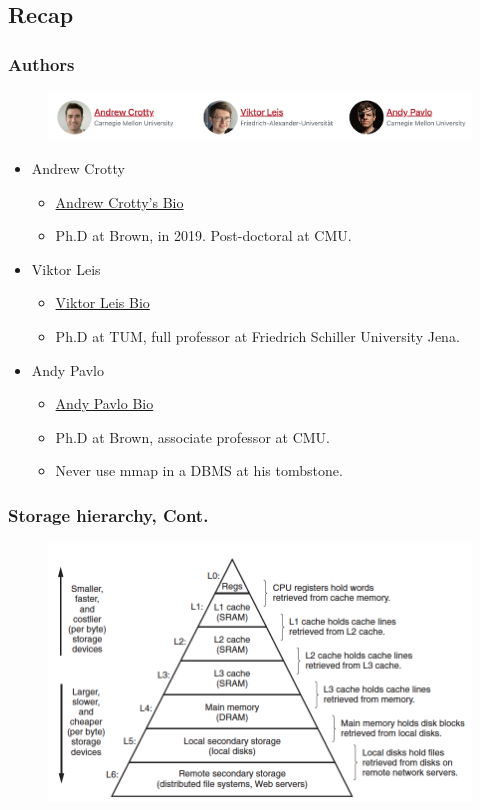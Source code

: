 \documentclass[10pt,svgnames,fragile]{beamer}
\begin{document}
\subsection{Recap}
\begin{frame}
	\frametitle{Authors}
	\begin{figure}[h]
		\includegraphics[width=0.99\linewidth]{images/author.png}
	\end{figure}
	\begin{itemize}
		\item Andrew Crotty
		\begin{itemize}
			\item[\checkmark] \href{https://cs.brown.edu/people/acrotty/}{\color{blue}Andrew Crotty's Bio}
			\item[\checkmark] Ph.D at Brown, in 2019. Post-doctoral at CMU.
		\end{itemize}
		\item Viktor Leis
		\begin{itemize}
			\item[\checkmark] \href{https://dbis1.github.io/team/leis}{\color{blue}Viktor Leis Bio}
			\item[\checkmark] Ph.D at TUM,  full professor at Friedrich Schiller University Jena.
		\end{itemize}
		\item Andy Pavlo
		\begin{itemize}
			\item[\checkmark] \href{https://www.cs.cmu.edu/\~pavlo/}{\color{blue}Andy Pavlo Bio}
			\item[\checkmark] Ph.D at Brown, associate professor at CMU.
			\item[\checkmark] {\color{red}Never use mmap in a DBMS at his tombstone.}
		\end{itemize}
	\end{itemize}
\end{frame}

\begin{frame}
	\frametitle{Storage hierarchy, Cont.}
	\begin{figure}[h]
		\includegraphics[width=0.99\linewidth]{images/Storage.png}
	\end{figure}
\end{frame}
\end{document}
